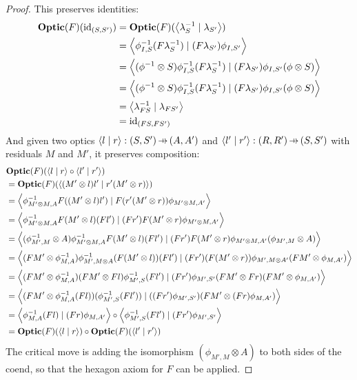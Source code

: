 \documentclass[11pt,letterpaper]{article}
\theoremstyle{plain}
\theoremstyle{definition}
\newcommand{\Optic}{\mathbf{Optic}}
\newcommand{\id}{\mathrm{id}}
\newcommand{\rep}[2]{{\ensuremath \left\langle #1 \mid #2 \right\rangle}}
\newcommand{\hto}{\ensuremath{\,\mathaccent\shortmid\rightarrow\,}}
\begin{document}
\begin{proof}
  This preserves identities:
  \begin{align*}
  \Optic(F)(\id_{(S, S')})
  &= \Optic(F)(\rep{\lambda^{-1}_S}{\lambda_{S'}}) \\
  &= \rep{\phi^{-1}_{I,S} (F\lambda^{-1}_S)}{(F\lambda_{S'}) \phi_{I,S'}} \\
  &= \rep{(\phi^{-1} \otimes S) \phi^{-1}_{I,S} (F\lambda^{-1}_S)}{(F\lambda_{S'}) \phi_{I,S'}(\phi \otimes S) } \\
  &= \rep{(\phi^{-1} \otimes S) \phi^{-1}_{I,S} (F\lambda^{-1}_S)}{(F\lambda_{S'}) \phi_{I,S'}(\phi \otimes S) } \\
  &= \rep{\lambda^{-1}_{FS}}{\lambda_{FS'}} \\
  &= \id_{(FS, FS')}
  \end{align*}
  And given two optics $\rep{l}{r} : (S, S') \hto (A, A')$ and $\rep{l'}{r'} : (R, R') \hto (S, S')$ with residuals $M$ and $M'$, it preserves composition:
\begin{align*}
&\Optic(F)(\rep{l}{r} \circ \rep{l'}{r'})  \\
&= \Optic(F)(\rep{(M' \otimes l)l'}{r'(M' \otimes r)}) \\
&= \rep{\phi^{-1}_{M' \otimes M,A} F((M' \otimes l)l')}{F(r'(M' \otimes r)) \phi_{M' \otimes M,A'}} \\
&= \rep{\phi^{-1}_{M' \otimes M,A} F(M' \otimes l)(Fl')}{(Fr') F(M' \otimes r) \phi_{M' \otimes M,A'}} \\
&= \rep{(\phi^{-1}_{M', M} \otimes A)\phi^{-1}_{M' \otimes M,A} F(M' \otimes l)(Fl')}{(Fr') F(M' \otimes r) \phi_{M' \otimes M,A'}(\phi_{M', M} \otimes A)} \\
&= \rep{(FM' \otimes \phi^{-1}_{M,A})\phi^{-1}_{M',M \otimes A}(F(M' \otimes l)) (Fl')}{(Fr') (F(M' \otimes r)) \phi_{M',M \otimes A'}  (FM' \otimes \phi_{M,A'})} \\
&= \rep{(FM' \otimes \phi^{-1}_{M,A})(FM' \otimes Fl)\phi^{-1}_{M',S} (Fl')}{(Fr') \phi_{M',S'} (FM' \otimes Fr) (FM' \otimes \phi_{M,A'})} \\
&= \rep{(FM' \otimes \phi^{-1}_{M,A} (Fl))(\phi^{-1}_{M',S} (Fl'))}{((Fr') \phi_{M',S'})(FM' \otimes (Fr) \phi_{M,A'})} \\
&= \rep{\phi^{-1}_{M,A} (Fl)}{(Fr) \phi_{M,A'}} \circ \rep{\phi^{-1}_{M',S} (Fl')}{(Fr') \phi_{M',S'}} \\
&= \Optic(F)(\rep{l}{r}) \circ \Optic(F)(\rep{l'}{r'})
\end{align*}
The critical move is adding the isomorphism $(\phi_{M', M} \otimes A)$ to both sides of the coend, so that the hexagon axiom for $F$ can be applied.
\end{proof}
\end{document}
